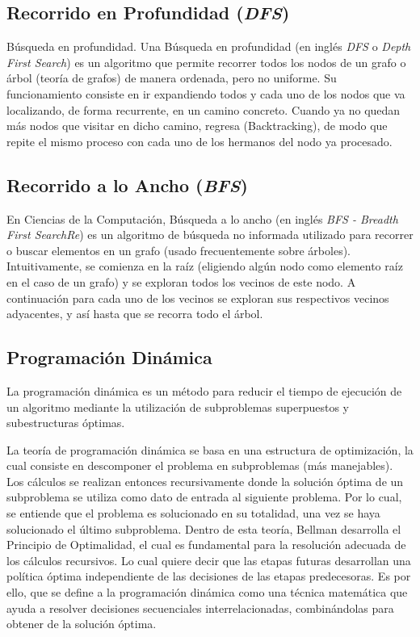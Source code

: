 \subsection{Recorrido en Profundidad (\emph{DFS})}
Búsqueda en profundidad. Una Búsqueda en profundidad (en inglés \emph{DFS} o \emph{Depth First Search}) es un algoritmo que permite recorrer todos los nodos de un grafo o árbol (teoría de grafos) de manera ordenada, pero no uniforme. Su funcionamiento consiste en ir expandiendo todos y cada uno de los nodos que va localizando, de forma recurrente, en un camino concreto. Cuando ya no quedan más nodos que visitar en dicho camino, regresa (Backtracking), de modo que repite el mismo proceso con cada uno de los hermanos del nodo ya procesado.

\subsection{Recorrido a lo Ancho (\emph{BFS})}
En Ciencias de la Computación, Búsqueda a lo ancho (en inglés \emph{BFS - Breadth First SearchRe}) es un algoritmo de búsqueda no informada utilizado para recorrer o buscar elementos en un grafo (usado frecuentemente sobre árboles). Intuitivamente, se comienza en la raíz (eligiendo algún nodo como elemento raíz en el caso de un grafo) y se exploran todos los vecinos de este nodo. A continuación para cada uno de los vecinos se exploran sus respectivos vecinos adyacentes, y así hasta que se recorra todo el árbol. 

\subsection{Programación Dinámica}
La programación dinámica es un método para reducir el tiempo de ejecución de un algoritmo mediante la utilización de subproblemas superpuestos y subestructuras óptimas. 

La teoría de programación dinámica se basa en una estructura de optimización, la cual consiste en descomponer el problema en subproblemas (más manejables). Los cálculos se realizan entonces recursivamente donde la solución óptima de un subproblema se utiliza como dato de entrada al siguiente problema. Por lo cual, se entiende que el problema es solucionado en su totalidad, una vez se haya solucionado el último subproblema. Dentro de esta teoría, Bellman desarrolla el Principio de Optimalidad, el cual es fundamental para la resolución adecuada de los cálculos recursivos. Lo cual quiere decir que las etapas futuras desarrollan una política óptima independiente de las decisiones de las etapas predecesoras. Es por ello, que se define a la programación dinámica como una técnica matemática que ayuda a resolver decisiones secuenciales interrelacionadas, combinándolas para obtener de la solución óptima. 